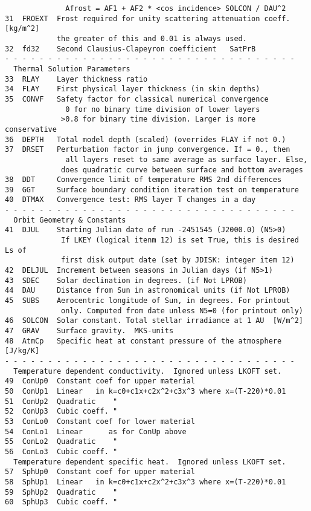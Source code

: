 \documentclass{article}
\begin{document}
\begin{verbatim}
              Afrost = AF1 + AF2 * <cos incidence> SOLCON / DAU^2
31  FROEXT  Frost required for unity scattering attenuation coeff. [kg/m^2]
            the greater of this and 0.01 is always used.
32  fd32    Second Clausius-Clapeyron coefficient   SatPrB
- - - - - - - - - - - - - - - - - - - - - - - - - - - - - - - - - - 
  Thermal Solution Parameters
33  RLAY    Layer thickness ratio
34  FLAY    First physical layer thickness (in skin depths)
35  CONVF   Safety factor for classical numerical convergence
              0 for no binary time division of lower layers
             >0.8 for binary time division. Larger is more conservative
36  DEPTH   Total model depth (scaled) (overrides FLAY if not 0.)
37  DRSET   Perturbation factor in jump convergence. If = 0., then
              all layers reset to same average as surface layer. Else,
             does quadratic curve between surface and bottom averages
38  DDT     Convergence limit of temperature RMS 2nd differences
39  GGT     Surface boundary condition iteration test on temperature
40  DTMAX   Convergence test: RMS layer T changes in a day
- - - - - - - - - - - - - - - - - - - - - - - - - - - - - - - - - - 
  Orbit Geometry & Constants
41  DJUL    Starting Julian date of run -2451545 (J2000.0) (N5>0)
             If LKEY (logical itenm 12) is set True, this is desired Ls of 
             first disk output date (set by JDISK: integer item 12)
42  DELJUL  Increment between seasons in Julian days (if N5>1)
43  SDEC    Solar declination in degrees. (if Not LPROB)
44  DAU     Distance from Sun in astronomical units (if Not LPROB)
45  SUBS    Aerocentric longitude of Sun, in degrees. For printout 
             only. Computed from date unless N5=0 (for printout only)
46  SOLCON  Solar constant. Total stellar irradiance at 1 AU  [W/m^2]
47  GRAV    Surface gravity.  MKS-units
48  AtmCp   Specific heat at constant pressure of the atmosphere [J/kg/K]
- - - - - - - - - - - - - - - - - - - - - - - - - - - - - - - - - - 
  Temperature dependent conductivity.  Ignored unless LKOFT set.
49  ConUp0  Constant coef for upper material 
50  ConUp1  Linear   in k=c0+c1x+c2x^2+c3x^3 where x=(T-220)*0.01
51  ConUp2  Quadratic    " 
52  ConUp3  Cubic coeff. "
53  ConLo0  Constant coef for lower material 
54  ConLo1  Linear      as for ConUp above
55  ConLo2  Quadratic    "
56  ConLo3  Cubic coeff. "
  Temperature dependent specific heat.  Ignored unless LKOFT set.
57  SphUp0  Constant coef for upper material 
58  SphUp1  Linear   in k=c0+c1x+c2x^2+c3x^3 where x=(T-220)*0.01
59  SphUp2  Quadratic    " 
60  SphUp3  Cubic coeff. "

\end{verbatim}
\end{document}
